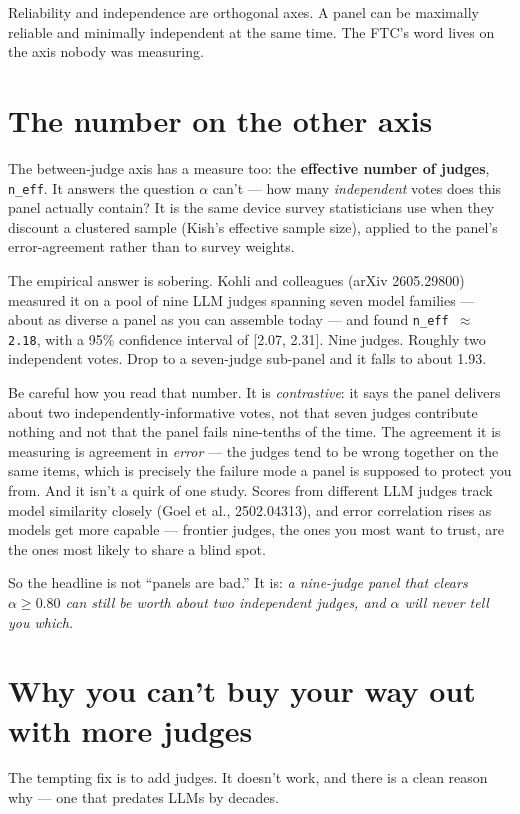 \documentclass[11pt,a4paper]{article}
\newcommand{\code}[1]{\texttt{#1}}
\begin{document}
Reliability and independence are orthogonal axes. A panel can be maximally reliable and minimally
independent at the same time. The FTC's word lives on the axis nobody was measuring.

\section{The number on the other axis}

The between-judge axis has a measure too: the \textbf{effective number of judges}, \code{n\_eff}.
It answers the question $\alpha$ can't --- how many \emph{independent} votes does this panel
actually contain? It is the same device survey statisticians use when they discount a clustered
sample (Kish's effective sample size), applied to the panel's error-agreement rather than to survey
weights.

The empirical answer is sobering. Kohli and colleagues (arXiv 2605.29800) measured it on a pool of
nine LLM judges spanning seven model families --- about as diverse a panel as you can assemble today
--- and found \code{n\_eff $\approx$ 2.18}, with a 95\% confidence interval of [2.07, 2.31]. Nine
judges. Roughly two independent votes. Drop to a seven-judge sub-panel and it falls to about 1.93.

Be careful how you read that number. It is \emph{contrastive}: it says the panel delivers about two
independently-informative votes, not that seven judges contribute nothing and not that the panel
fails nine-tenths of the time. The agreement it is measuring is agreement in \emph{error} --- the
judges tend to be wrong together on the same items, which is precisely the failure mode a panel is
supposed to protect you from. And it isn't a quirk of one study. Scores from different LLM judges
track model similarity closely (Goel et al., 2502.04313), and error correlation rises as models get
more capable --- frontier judges, the ones you most want to trust, are the ones most likely to share
a blind spot.

So the headline is not ``panels are bad.'' It is: \emph{a nine-judge panel that clears
$\alpha \geq 0.80$ can still be worth about two independent judges, and $\alpha$ will never tell you
which.}

\section{Why you can't buy your way out with more judges}

The tempting fix is to add judges. It doesn't work, and there is a clean reason why --- one that
predates LLMs by decades.
\end{document}
